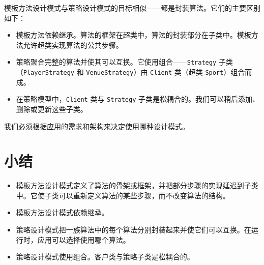 模板方法设计模式与策略设计模式的目标相似——都是封装算法。它们的主要区别如下：

\begin{itemize}
\item 模板方法依赖继承。算法的框架在超类中，算法的封装部分在子类中。模板方法允许超类实现算法的公共步骤。
\item 策略聚合完整的算法并使其可以互换。它使用组合——\texttt{Strategy} 子类（\texttt{Player\allowbreak{}Strategy} 和 \texttt{Venue\allowbreak{}Strategy}）由 \texttt{Client} 类（超类 \texttt{Sport}）组合而成。
\item 在策略模型中，\texttt{Client} 类与 \texttt{Strategy} 子类是松耦合的。我们可以稍后添加、删除或更新这些子类。
\end{itemize}

我们必须根据应用的需求和架构来决定使用哪种设计模式。


\section*{小结}

\begin{itemize}
\item 模板方法设计模式定义了算法的骨架或框架，并把部分步骤的实现延迟到子类中。它使子类可以重新定义算法的某些步骤，而不改变算法的结构。
\item 模板方法设计模式依赖继承。
\item 策略设计模式把一族算法中的每个算法分别封装起来并使它们可以互换。在运行时，应用可以选择使用哪个算法。
\item 策略设计模式使用组合。客户类与策略子类是松耦合的。
\end{itemize}
